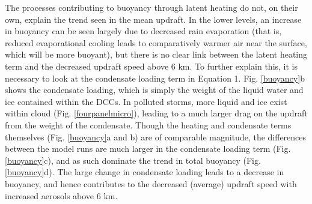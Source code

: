 The processes contributing to buoyancy through latent heating do not, on their own, explain the trend seen in the mean updraft.  In the lower levels, an increase in buoyancy can be seen largely due to decreased rain evaporation  (that is, reduced evaporational cooling leads to comparatively warmer air near the surface, which will be more buoyant), but there is no clear link between the latent heating term and the decreased updraft speed above 6 km.  To further explain this, it is necessary to look at the condensate loading term in Equation 1.  Fig. \ref{buoyancy}b shows the condensate loading, which is simply the weight of the liquid water and ice contained within the DCCs.  In polluted storms, more liquid and ice exist within cloud (Fig. \ref{fourpanelmicro}), leading to a much larger drag on the updraft from the weight of the condensate.  Though the heating and condensate terms themselves (Fig. \ref{buoyancy}a and b) are of comparable magnitude, the differences between the model runs are much larger in the condensate loading term (Fig. \ref{buoyancy}c), and as such dominate the trend in total buoyancy (Fig. \ref{buoyancy}d). The large change in condensate loading leads to a decrease in buoyancy, and hence contributes to the decreased (average) updraft speed with increased aerosols above 6 km.   

